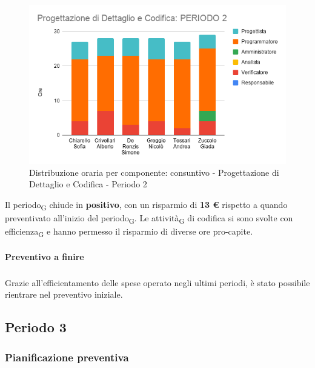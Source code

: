 \contabilitaTable{
	
}

\begin{figure}[H]
	\centering
	\includegraphics[scale=0.6]{res/images/charts/consuntivo/prog_dett_2.png}
	\caption{Distribuzione oraria per componente: consuntivo - Progettazione di Dettaglio e Codifica - Periodo 2}
\end{figure}


Il periodo\textsubscript{G} chiude in \textbf{positivo}, con un risparmio di \textbf{13 \euro} rispetto a quando preventivato all'inizio del periodo\textsubscript{G}. Le attività\textsubscript{G} di codifica si sono svolte con efficienza\textsubscript{G} e hanno permesso il risparmio di diverse ore pro-capite.


\paragraph{Preventivo a finire}
\subparagraph*{}

\pafTable{
	
}

Grazie all'efficientamento delle spese operato negli ultimi periodi, è stato possibile rientrare nel preventivo iniziale.


\pagebreak
\subsection{Periodo 3}

\subsubsection{Pianificazione preventiva}

